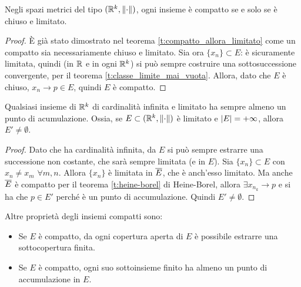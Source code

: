 \begin{teorema}
\label{t:heine-borel}
Negli spazi metrici del tipo $(\mathbb{R}^k,\lVert\cdot\rVert)$, ogni insieme è compatto se e solo se è chiuso e limitato.
\end{teorema}
\begin{proof}
È già stato dimostrato nel teorema \ref{t:compatto_allora_limitato} come un compatto sia necessariamente chiuso e limitato.
Sia ora $\{x_n\}\subset E$: è sicuramente limitata, quindi (in $\mathbb{R}$ e in ogni $\mathbb{R}^k$) si può sempre costruire una sottosuccessione convergente, per il teorema \ref{t:classe_limite_mai_vuota}. Allora, dato che $E$ è chiuso, $x_n\to p\in E$, quindi $E$ è compatto.
\end{proof}
\begin{teorema}
\label{t:bolzano-weierstrass}
Qualsiasi insieme di $\mathbb{R}^k$ di cardinalità infinita e limitato ha sempre almeno un punto di acumulazione. Ossia, se $E\subset(\mathbb{R}^k,\lVert\cdot\rVert)$ è limitato e $\lvert E\rvert=+\infty$, allora $E'\neq\emptyset$.
\end{teorema}
\begin{proof}
Dato che ha cardinalità infinita, da $E$ si può sempre estrarre una successione non costante, che sarà sempre limitata (e in $E$). Sia $\{x_n\}\subset E$ con $x_n\neq x_m$ $\forall m,n$. Allora $\{x_n\}$ è limitata in $\overline{E}$, che è anch'esso limitato. Ma anche $\overline{E}$ è compatto per il teorema \ref{t:heine-borel} di Heine-Borel, allora $\exists x_{n_k}\to p$ e si ha che $p\in E'$ perché è un punto di accumulazione. Quindi $E'\neq\emptyset$.
\end{proof}
Altre proprietà degli insiemi compatti sono:
\begin{itemize}
\item Se $E$ è compatto, da ogni copertura aperta di $E$ è possibile estrarre una sottocopertura finita.
\item Se $E$ è compatto, ogni suo sottoinsieme finito ha almeno un punto di accumulazione in $E$.
\end{itemize}
